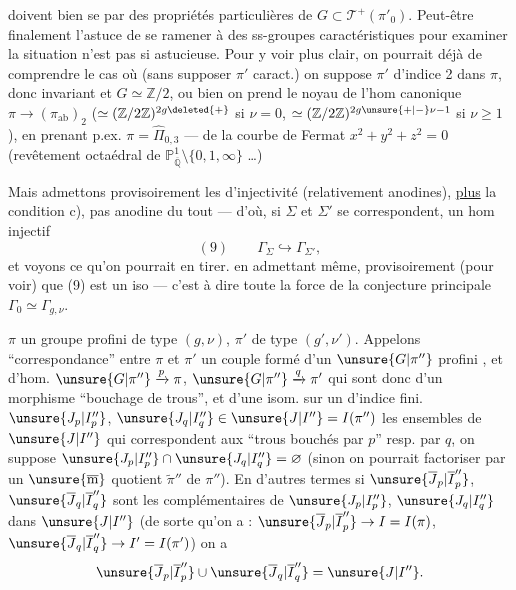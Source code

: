 doivent bien se  par des propriétés
particulières de $G\subset\mathcal T^{+}(\pi'_0)$. Peut-être
finalement l'astuce de se ramener à des
ss-groupes caractéristiques pour examiner
la situation n'est  pas si astucieuse.
Pour y voir plus clair, on pourrait déjà
 de comprendre le cas où (sans
supposer $\pi'$ caract.) on suppose $\pi'$ d'indice
2 dans $\pi$, donc invariant et $G\simeq\mathbb Z/2$, ou
bien on prend  le noyau de l'hom
canonique $\pi\longrightarrow(\pi_{\mathrm{ab}})_2$ ($\simeq(\mathbb Z/2\mathbb Z)^{2g\deleted{+}}$ si $\nu=0$,
$\simeq(\mathbb Z/2\mathbb Z)^{2g\unsure{+|-}\nu-1}$ si $\nu\geq1$), en prenant p.ex.
$\pi=\widehat\Pi_{0,3}$ ---  de la courbe de
Fermat $x^2+y^2+z^2=0$ (revêtement octaédral
de $\mathbb P^1_{\overline{\mathbb Q}}\setminus\{0,1,\infty\}$ \dots)

Mais admettons provisoirement les 
d'injectivité (relativement anodines), \uline{plus} la
condition c), pas anodine du tout ---
d'où, si $\Sigma$ et $\Sigma'$ se correspondent, un hom
injectif
\[
(9)\qquad \Gamma_{\Sigma}\hookrightarrow\Gamma_{\Sigma'},
\]
et voyons ce qu'on pourrait en tirer.
en admettant même, provisoirement (pour
voir) que (9) est un iso --- 
c'est à dire toute la force de la conjecture
principale $\Gamma_0\simeq\Gamma_{g,\nu}$.

 $\pi$ un groupe profini  de type $(g,\nu)$, $\pi'$ de type $(g',\nu')$. Appelons ``correspondance'' entre $\pi$ et $\pi'$ un  couple formé d'un $\unsure{G|\pi''}$ profini  , et d'hom.  $\unsure{G|\pi''}\xrightarrow{p}\pi$, $\unsure{G|\pi''}\xrightarrow{q}\pi'$ qui sont donc   d'un morphisme ``bouchage de trous'', et d'une  isom. sur un  d'indice fini.
 $\unsure{J_p|I''_p}$, $\unsure{J_q|I''_q}\in\unsure{J|I''}=I(\pi'')$ les ensembles de $\unsure{J|I''}$ qui correspondent aux ``trous bouchés par $p$'' resp. par $q$, on suppose  $\unsure{J_p|I''_p}\cap\unsure{J_q|I''_q}=\varnothing$ (sinon on pourrait factoriser par un $\unsure{\overline{\mathrm m}}$ quotient $\widetilde{\pi}''$ de $\pi''$). En d'autres termes si $\unsure{\overline{J}_p|\overline{I}''_p}$, $\unsure{\overline{J}_q|\overline{I}''_q}$ sont les complémentaires de $\unsure{J_p|I''_p}$, $\unsure{J_q|I''_q}$ dans $\unsure{J|I''}$ (de sorte qu'on a : $\unsure{\overline{J}_p|\overline{I}''_p}\to I=I(\pi)$, $\unsure{\overline{J}_q|\overline{I}''_q}\to I'=I(\pi')$) on a
\[
\unsure{\overline{J}_p|\overline{I}''_p}\cup\unsure{\overline{J}_q|\overline{I}''_q}=\unsure{J|I''}.
\]


